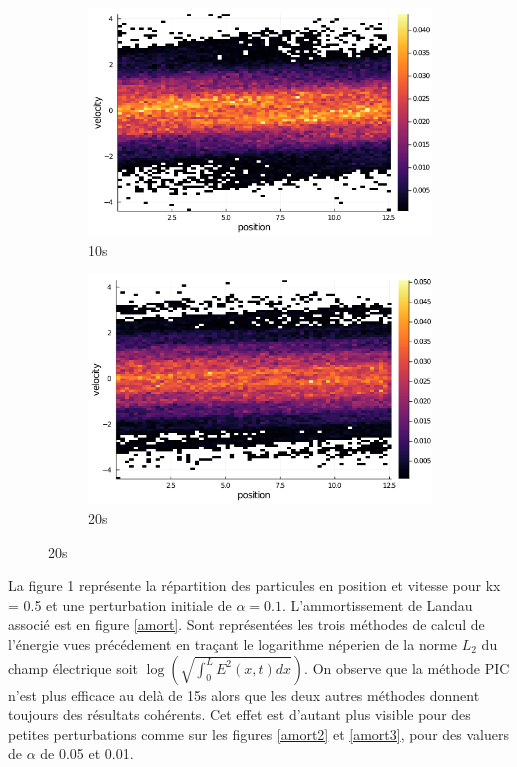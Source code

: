 \documentclass[a4paper,11pt]{article}
\begin{document}
\begin{figure}[!h]
\begin{subfigure}{0.5\textwidth}
	\centering
	\caption{10s}
	\includegraphics[width = \linewidth]{fig/kx=0.5, alpha=0.1, it=50.png}
\end{subfigure}
\begin{subfigure}{0.5\textwidth}
	\centering
	\caption{20s}
	\includegraphics[width = \linewidth]{fig/kx=0.5, alpha=0.1, it=100.png}
\end{subfigure}
\end{figure}

La figure 1 représente la répartition des particules en position et vitesse pour kx = 0.5 et une perturbation initiale de $\alpha = 0.1$. L'ammortissement de Landau associé est en figure \ref{amort}. Sont représentées les trois méthodes de calcul de l'énergie vues précédement en traçant le logarithme néperien de la norme $L_2$ du champ électrique soit $\log(\sqrt{\int_{0}^{L} E^2(x,t) dx})$. On observe que la méthode PIC n'est plus efficace au delà de 15s alors que les deux autres méthodes donnent toujours des résultats cohérents. Cet effet est d'autant plus visible pour des petites perturbations comme sur les figures \ref{amort2} et \ref{amort3}, pour des valuers de $\alpha$ de 0.05 et 0.01.
\end{document}
